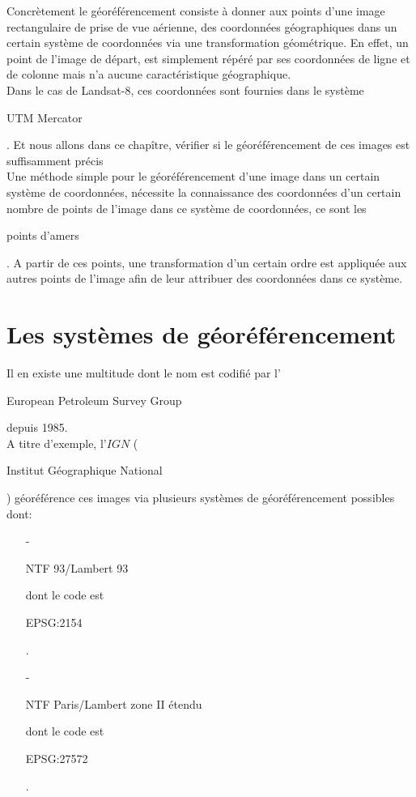 \documentclass{book}
\begin{document}
Concrètement le géoréférencement consiste à donner aux points 
d'une image rectangulaire de prise de vue aérienne, des coordonnées géographiques dans un certain système de coordonnées
via une transformation géométrique. 
En effet, un point de l'image de départ, est simplement répéré par ses coordonnées de ligne et de colonne mais n'a aucune caractéristique
géographique.\\
Dans le cas de Landsat-8, ces coordonnées sont fournies dans le système \begin{itshape}UTM Mercator\end{itshape}. Et nous allons dans ce chapître, 
vérifier si le géoréférencement de ces images est suffisamment précis\\

Une méthode simple pour le géoréférencement d'une image dans un certain système de coordonnées, nécessite la connaissance 
des coordonnées d'un 
certain nombre de points de l'image dans ce système de coordonnées, ce sont les \begin{itshape}points d'amers\end{itshape}.
A partir de ces points, une transformation d'un certain ordre est appliquée aux autres points de l'image afin de leur attribuer 
des coordonnées dans ce système.\\

\section{Les systèmes de géoréférencement}

Il en existe une multitude dont le nom est codifié par l'\begin{itshape}European Petroleum Survey Group\end{itshape} depuis 1985.\\
A titre d'exemple, l'$IGN$ (\begin{itshape}Institut Géographique National\end{itshape}) géoréférence ces images via plusieurs
systèmes de géoréférencement possibles dont:\\

\begin{itemize}

\item[-] \begin{itshape}NTF 93/Lambert 93\end{itshape} dont le code est \begin{itshape}EPSG:2154\end{itshape}.\\
\item[-] \begin{itshape}NTF Paris/Lambert zone II étendu\end{itshape} dont le code est \begin{itshape}EPSG:27572\end{itshape}.\\
 
\end{itemize}
\end{document}
